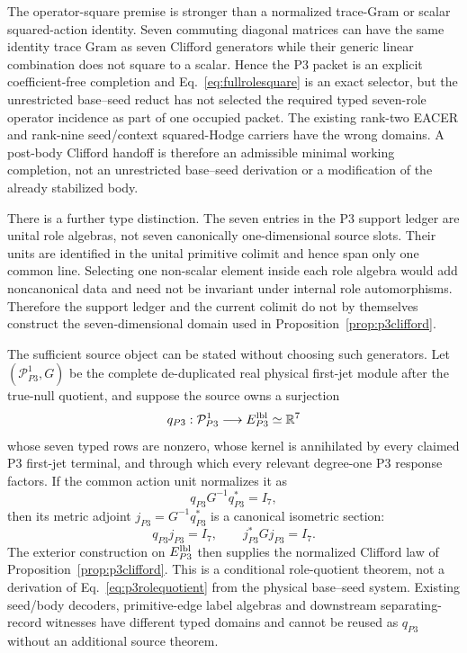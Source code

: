 The operator-square premise is stronger than a normalized trace-Gram or
scalar squared-action identity.  Seven commuting diagonal matrices can have
the same identity trace Gram as seven Clifford generators while their generic
linear combination does not square to a scalar.  Hence the P3 packet is an
explicit coefficient-free completion and Eq.~\eqref{eq:fullrolesquare} is an
exact selector, but the unrestricted base--seed reduct has not selected the
required typed seven-role operator incidence as part of one occupied packet.
The existing rank-two EACER and rank-nine
seed/context squared-Hodge carriers have the wrong domains.  A post-body
Clifford handoff is therefore an admissible minimal working completion, not an
unrestricted base--seed derivation or a modification of the already stabilized body.

There is a further type distinction.  The seven entries in the P3 support
ledger are unital role algebras, not seven canonically one-dimensional source
slots.  Their units are identified in the unital primitive colimit and hence
span only one common line.  Selecting one non-scalar element inside each role
algebra would add noncanonical data and need not be invariant under internal
role automorphisms.  Therefore the support ledger and the current colimit do
not by themselves construct the seven-dimensional domain used in
Proposition~\ref{prop:p3clifford}.

The sufficient source object can be stated without choosing such generators.
Let $(\mathcal P_{P3}^1,G)$ be the complete de-duplicated real physical
first-jet module after the true-null quotient, and suppose the source owns a
surjection
\begin{equation}
q_{P3}:\mathcal P_{P3}^1\longrightarrow E_{P3}^{\rm lbl}\simeq\mathbb R^7
\label{eq:p3rolequotient}
\end{equation}
whose seven typed rows are nonzero, whose kernel is annihilated by every
claimed P3 first-jet terminal, and through which every relevant degree-one
P3 response factors.  If the common action unit normalizes it as
\begin{equation}
q_{P3}G^{-1}q_{P3}^{*}=I_7,
\label{eq:p3coisometry}
\end{equation}
then its metric adjoint
$j_{P3}=G^{-1}q_{P3}^{*}$ is a canonical isometric section:
\begin{equation}
q_{P3}j_{P3}=I_7,
\qquad
j_{P3}^{*}G j_{P3}=I_7.
\label{eq:p3isometricsection}
\end{equation}
The exterior construction on $E_{P3}^{\rm lbl}$ then supplies the normalized
Clifford law of Proposition~\ref{prop:p3clifford}.  This is a conditional
role-quotient theorem, not a derivation of Eq.~\eqref{eq:p3rolequotient} from
the physical base--seed system.  Existing seed/body decoders, primitive-edge
label algebras and downstream separating-record witnesses have different
typed domains and cannot be reused as $q_{P3}$ without an additional source
theorem.

